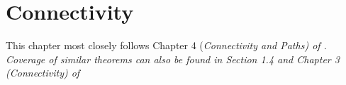 \chapter{Connectivity}

This chapter most closely follows Chapter 4 (\it{Connectivity and Paths}) of \cite{west}. Coverage of similar theorems can also be found in Section 1.4 and Chapter 3 (\it{Connectivity}) of \cite{diestel}




